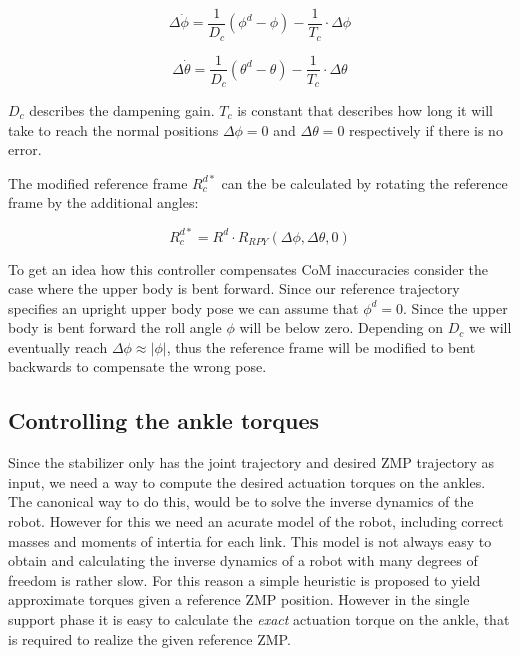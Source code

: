 \documentclass[english,ngerman]{KITreprt}
\begin{document}
\begin{equation}
\Delta \dot{\phi} = \frac{1}{D_c} (\phi^d - \phi) - \frac{1}{T_c} \cdot \Delta \phi
\end{equation}

\begin{equation}
\Delta \dot{\theta} = \frac{1}{D_c} (\theta^d - \theta) - \frac{1}{T_c} \cdot \Delta \theta
\end{equation}

$D_c$ describes the dampening gain. $T_c$ is constant that describes how
long it will take to reach the normal positions $\Delta \phi = 0$ and
$\Delta \theta = 0$ respectively if there is no error.

The modified reference frame $R^{d*}_c$ can the be calculated by
rotating the reference frame by the additional angles:

\begin{equation}
R^{d*}_c = R^d \cdot R_{RPY}(\Delta \phi, \Delta \theta, 0)
\end{equation}

To get an idea how this controller compensates CoM inaccuracies consider
the case where the upper body is bent forward. Since our reference
trajectory specifies an upright upper body pose we can assume that
$\phi^d = 0$. Since the upper body is bent forward the roll angle $\phi$
will be below zero. Depending on $D_c$ we will eventually reach
$\Delta \phi \approx |\phi|$, thus the reference frame will be modified
to bent backwards to compensate the wrong pose.

\subsection{Controlling the ankle
torques}\label{controlling-the-ankle-torques}

Since the stabilizer only has the joint trajectory and desired ZMP
trajectory as input, we need a way to compute the desired actuation
torques on the ankles. The canonical way to do this, would be to solve
the inverse dynamics of the robot. However for this we need an acurate
model of the robot, including correct masses and moments of intertia for
each link. This model is not always easy to obtain and calculating the
inverse dynamics of a robot with many degrees of freedom is rather slow.
For this reason a simple heuristic is proposed to yield approximate
torques given a reference ZMP position. However in the single support
phase it is easy to calculate the \emph{exact} actuation torque on the
ankle, that is required to realize the given reference ZMP.
\end{document}
